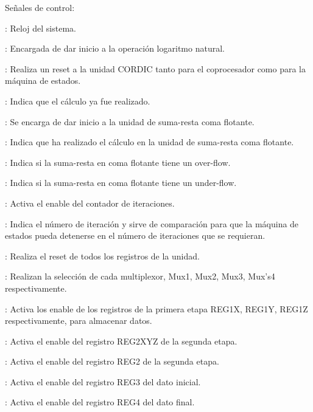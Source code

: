 Señales de control: 

\begin{compactitem}
\item {}: Reloj del sistema. 

\item {}: Encargada de dar inicio a la operación logaritmo natural. 

\item {}: Realiza un reset a la unidad CORDIC tanto para el coprocesador como para la máquina de estados.
 

\item {}: Indica que el cálculo ya fue realizado.

\item {}: Se encarga de dar inicio a la unidad de suma-resta coma flotante.

\item {}: Indica que ha realizado el cálculo en la unidad de suma-resta coma flotante.

\item {}: Indica si la suma-resta en coma flotante tiene un over-flow.

\item {}: Indica si la suma-resta en coma flotante tiene un under-flow.

\item {}: Activa el enable del contador de iteraciones. 

\item {}: Indica el número de iteración y sirve de comparación para que la máquina de estados pueda detenerse en el número de iteraciones que se requieran.
 
\item {}: Realiza el reset de todos los registros de la unidad.

\item {}: Realizan la selección de cada multiplexor, Mux1, Mux2, Mux3, Mux's4 respectivamente.

\item {}: Activa los enable de los registros de la primera etapa REG1X, REG1Y, REG1Z respectivamente, para almacenar datos. 

\item {}: Activa el enable del registro REG2XYZ de la segunda etapa. 

\item {}: Activa el enable del registro REG2 de la segunda etapa.

\item {}: Activa el enable del registro REG3 del dato inicial.

\item {}: Activa el enable del registro REG4 del dato final. 

\end{compactitem}

